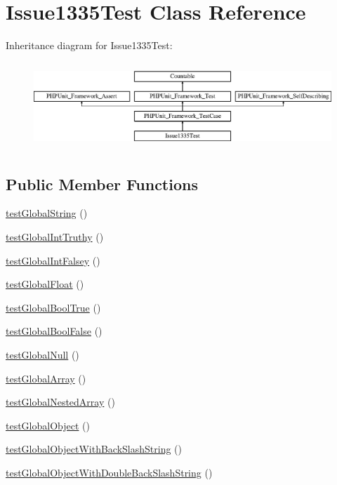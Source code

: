 \hypertarget{class_issue1335_test}{}\section{Issue1335\+Test Class Reference}
\label{class_issue1335_test}
Inheritance diagram for Issue1335\+Test\+:\begin{figure}[H]
\begin{center}
\leavevmode
\includegraphics[height=3.303835cm]{class_issue1335_test}
\end{center}
\end{figure}
\subsection*{Public Member Functions}
\begin{DoxyCompactItemize}
\item 
\mbox{\hyperlink{class_issue1335_test_a190e90c36bcc3f13c1b2b97f00950e88}{test\+Global\+String}} ()
\item 
\mbox{\hyperlink{class_issue1335_test_af26a250fa3fe52fcd44779ad8672cb7d}{test\+Global\+Int\+Truthy}} ()
\item 
\mbox{\hyperlink{class_issue1335_test_a76e187b678790b34c9fc37320877bf07}{test\+Global\+Int\+Falsey}} ()
\item 
\mbox{\hyperlink{class_issue1335_test_a9c0999e77c5e234953621ff14500ccb5}{test\+Global\+Float}} ()
\item 
\mbox{\hyperlink{class_issue1335_test_a6a25ed2c16581db2975f0e9815e7c32b}{test\+Global\+Bool\+True}} ()
\item 
\mbox{\hyperlink{class_issue1335_test_a5a2ce35c2e02836eeb617d8a8ec59e77}{test\+Global\+Bool\+False}} ()
\item 
\mbox{\hyperlink{class_issue1335_test_a2893c1f8bb73cfefd86d4fa5aec4db0c}{test\+Global\+Null}} ()
\item 
\mbox{\hyperlink{class_issue1335_test_a7b451b4a43afd3e0fe050084c8847d13}{test\+Global\+Array}} ()
\item 
\mbox{\hyperlink{class_issue1335_test_a807489796544f7b2525c1356a6661613}{test\+Global\+Nested\+Array}} ()
\item 
\mbox{\hyperlink{class_issue1335_test_acd29a0ab7be3aff7d666f7c888f56898}{test\+Global\+Object}} ()
\item 
\mbox{\hyperlink{class_issue1335_test_a2c906204a7e1db160c07ec18b648639e}{test\+Global\+Object\+With\+Back\+Slash\+String}} ()
\item 
\mbox{\hyperlink{class_issue1335_test_a6e899264f5544c6099ee26812fdf5b1e}{test\+Global\+Object\+With\+Double\+Back\+Slash\+String}} ()
\end{DoxyCompactItemize}
